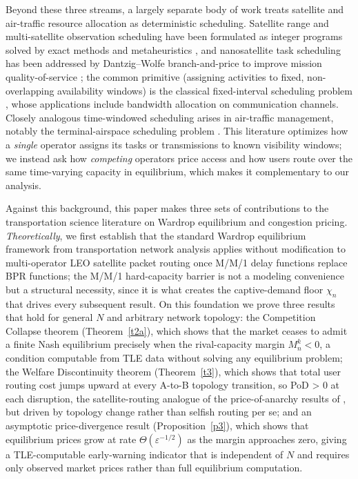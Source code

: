 \documentclass[review,3p,authoryear]{elsarticle}
\begin{document}
Beyond these three streams, a largely separate body of work treats satellite and air-traffic resource allocation as deterministic scheduling. Satellite range and multi-satellite observation scheduling have been formulated as integer programs solved by exact methods and metaheuristics \citep{chen2019mixed, wang2025solving}, and nanosatellite task scheduling has been addressed by Dantzig--Wolfe branch-and-price to improve mission quality-of-service \citep{rigo2022branch}; the common primitive (assigning activities to fixed, non-overlapping availability windows) is the classical fixed-interval scheduling problem \citep{kovalyov2007fixed}, whose applications include bandwidth allocation on communication channels. Closely analogous time-windowed scheduling arises in air-traffic management, notably the terminal-airspace scheduling problem \citep{ng2024optimization}. This literature optimizes how a \emph{single} operator assigns its tasks or transmissions to known visibility windows; we instead ask how \emph{competing} operators price access and how users route over the same time-varying capacity in equilibrium, which makes it complementary to our analysis.

Against this background, this paper makes three sets of contributions to the transportation science literature on Wardrop equilibrium and congestion pricing. \emph{Theoretically}, we first establish that the standard Wardrop equilibrium framework from transportation network analysis applies without modification to multi-operator LEO satellite packet routing once M/M/1 delay functions replace BPR functions; the M/M/1 hard-capacity barrier is not a modeling convenience but a structural necessity, since it is what creates the captive-demand floor ${\chi_n}$ that drives every subsequent result. On this foundation we prove three results that hold for general $N$ and arbitrary network topology: the Competition Collapse theorem (Theorem~\ref{t2a}), which shows that the market ceases to admit a finite Nash equilibrium precisely when the rival-capacity margin $M_{n}^{k} < 0$, a condition computable from TLE data without solving any equilibrium problem; the Welfare Discontinuity theorem (Theorem~\ref{t3}), which shows that total user routing cost jumps upward at every A-to-B topology transition, so PoD > 0 at each disruption, the satellite-routing analogue of the price-of-anarchy results of \citet{roughgarden2002bad}, but driven by topology change rather than selfish routing per se; and an asymptotic price-divergence result (Proposition~\ref{p3}), which shows that equilibrium prices grow at rate ${\Theta}({\varepsilon}^{-1/2})$ as the margin approaches zero, giving a TLE-computable early-warning indicator that is independent of $N$ and requires only observed market prices rather than full equilibrium computation.
\end{document}
